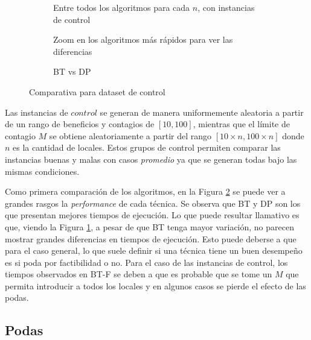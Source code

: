 \begin{figure}[H]
    \centering
    \begin{subfigure}[H]{0.45\textwidth}
        \centering
        
        \caption{Entre todos los algoritmos para cada $n$, con instancias de control}
    \end{subfigure}
    \begin{subfigure}[H]{0.45\textwidth}
        \centering
        
        \caption{Zoom en los algoritmos más rápidos para ver las diferencias}
    \end{subfigure}
    \begin{subfigure}[H]{0.45\textwidth}
        \centering
        
        \caption{BT vs DP}
        \label{fig:comp-control-bt-dp}
    \end{subfigure}
    \caption{Comparativa para dataset de control}
    \label{fig:comp-control}
\end{figure}

Las instancias de $control$ se generan de manera uniformemente aleatoria a partir de un rango de beneficios y contagios de $[10, 100]$, mientras que el límite de contagio $M$ se obtiene aleatoriamente a partir del rango $[10\times n, 100\times n]$ donde $n$ es la cantidad de locales. Estos grupos de control permiten comparar las instancias buenas y malas con casos \textit{promedio} ya que se generan todas bajo las mismas condiciones.

Como primera comparación de los algoritmos, en la Figura \ref{fig:comp-control} se puede ver a grandes rasgos la \textit{performance} de cada técnica. Se observa que BT y DP son los que presentan mejores tiempos de ejecución. Lo que puede resultar llamativo es que, viendo la Figura \ref{fig:comp-control-bt-dp}, a pesar de que BT tenga mayor variación, no parecen mostrar grandes diferencias en tiempos de ejecución. Esto puede deberse a que para el caso general, lo que suele definir si una técnica tiene un buen desempeño es si poda por factibilidad o no. Para el caso de las instancias de control, los tiempos observados en BT-F se deben a que es probable que se tome un $M$ que permita introducir a todos los locales y en algunos casos se pierde el efecto de las podas.

\subsection{Podas}

